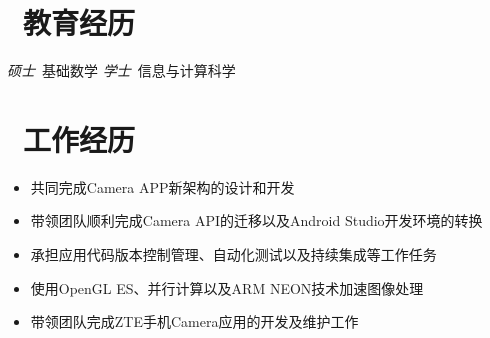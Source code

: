 \documentclass{resume}
\begin{document}



\section{\faGraduationCap\  教育经历}
\textit{硕士}\ 基础数学
\textit{学士}\ 信息与计算科学

\section{\faUsers\ 工作经历}
\begin{onehalfspacing}
\begin{itemize}
  \item 共同完成Camera APP新架构的设计和开发
  \item 带领团队顺利完成Camera API的迁移以及Android Studio开发环境的转换
  \item 承担应用代码版本控制管理、自动化测试以及持续集成等工作任务
  \item 使用OpenGL ES、并行计算以及ARM NEON技术加速图像处理
  \item 带领团队完成ZTE手机Camera应用的开发及维护工作
\end{itemize}
\end{onehalfspacing}


\end{document}
